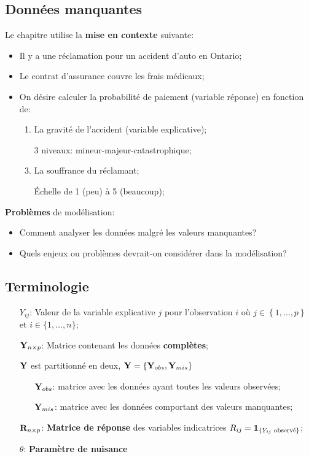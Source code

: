 \documentclass[10pt, french]{article}
\begin{document}
\begin{multicols*}{3} 

\setcounter{section}{1}
\section{Données manquantes}

Le chapitre utilise la \textbf{mise en contexte} suivante:
\begin{itemize}
	\item	Il y a une réclamation pour un accident d'auto en Ontario;
	\item	Le contrat d'assurance couvre les frais médicaux;
	\item	On désire calculer la probabilité de paiement (variable réponse) en fonction de:
		\begin{enumerate}
		\item	La gravité de l'accident (variable explicative);
		\item[]	3 niveaux: mineur-majeur-catastrophique;
		\item	La souffrance du réclamant;
		\item[]	Échelle de 1 (peu) à 5 (beaucoup);
		\end{enumerate}
\end{itemize}

\textbf{Problèmes} de modélisation:
\begin{itemize}
	\item	Comment analyser les données malgré les valeurs manquantes?
	\item	Quels enjeux ou problèmes devrait-on considérer dans la modélisation?
\end{itemize}

\subsection*{Terminologie}

\begin{definition}[Notation]
\begin{itemize}
	\item[$Y_{ij}$:] Valeur de la variable explicative $j$ pour l'observation $i$ où	$j \in \left\{ 1, \dots, p \right\}$ et $i \in \{1, \dots, n\}$;
	\item[$\mathbf{Y}_{n \times p}$:] Matrice contenant les données \textbf{complètes};
	\item[]	$\mathbf{Y}$ est partitionné en deux, $\mathbf{Y} = \left\{ \mathbf{Y}_{obs}, \mathbf{Y}_{mis} \right\}$
		\begin{itemize}
		\item[$\mathbf{Y}_{obs}$:] matrice avec les données ayant toutes les valeurs observées;
		\item[$\mathbf{Y}_{mis}$:] matrice avec les données comportant des valeurs manquantes;
		\end{itemize}
	\item[$\mathbf{R}_{n \times p}$:]	\textbf{Matrice de réponse} des variables indicatrices $R_{ij} = \mathbf{1}_{\{Y_{ij} \text{ observé}\}}$;
	\item[$\theta$:] \textbf{Paramètre de nuisance}
\end{itemize}
\end{definition}


\end{multicols*}
\end{document}
